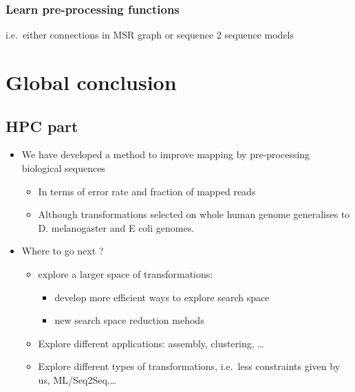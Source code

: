\documentclass[
  11pt,
  twoside]{scrbook}
\begin{document}
\hypertarget{learn-pre-processing-functions}{%
\subsection{Learn pre-processing functions}\label{learn-pre-processing-functions}}

i.e.~either connections in MSR graph or sequence 2 sequence models

\printbibliography[segment=\therefsegment,heading=subbibintoc,title={References for chapter \thechapter}]

\hypertarget{global-conclusion}{%
\chapter*{Global conclusion}\label{global-conclusion}}

\hypertarget{hpc-part}{%
\section*{HPC part}\label{hpc-part}}

\begin{itemize}
\item
  We have developed a method to improve mapping by pre-processing biological sequences

  \begin{itemize}
  \item
    In terms of error rate and fraction of mapped reads
  \item
    Although transformations selected on whole human genome generalises to D. melanogaster and E coli genomes.
  \end{itemize}
\item
  Where to go next ?

  \begin{itemize}
  \item
    explore a larger space of transformations:

    \begin{itemize}
    \item
      develop more efficient ways to explore search space
    \item
      new search space reduction mehods
    \end{itemize}
  \item
    Explore different applications: assembly, clustering, \ldots{}
  \item
    Explore different types of transformations, i.e.~less constraints given by us, ML/Seq2Seq,\ldots{}
  \end{itemize}
\end{itemize}
\end{document}
